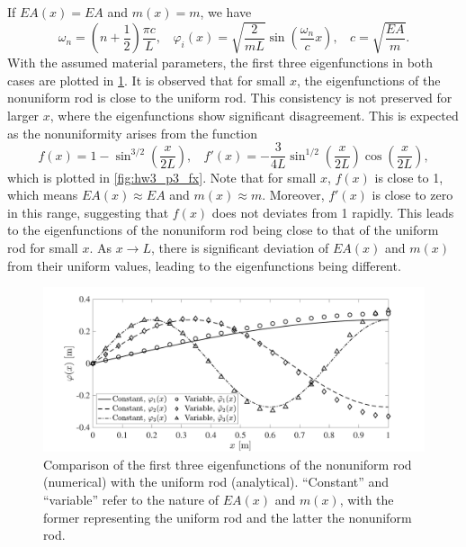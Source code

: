 If $EA(x) = EA$ and $m(x) = m$, we have 
\begin{equation}
    \omega_n = \left(n + \frac{1}{2}\right)\frac{\pi c}{L}, ~~~~ \varphi_i(x) = \sqrt{\frac{2}{m L}} \sin \left(\frac{\omega_n}{c} x\right), ~~~~ c = \sqrt{\frac{EA}{m}}.
\end{equation}
With the assumed material parameters, the first three eigenfunctions in both cases are plotted in \cref{fig:hw3_p3_results}.
It is observed that for small $x$, the eigenfunctions of the nonuniform rod is close to the uniform rod.
This consistency is not preserved for larger $x$, where the eigenfunctions show significant disagreement.
This is expected as the nonuniformity arises from the function
\begin{equation}\label{eqn:hw3_p3_fx}
    f(x) = 1 - \sin^{3/2}\left(\frac{x}{2L}\right), ~~~~ f'(x) = -\frac{3}{4L} \sin^{1/2}\left(\frac{x}{2L}\right) \cos\left(\frac{x}{2L}\right),
\end{equation}
which is plotted in \cref{fig:hw3_p3_fx}.
Note that for small $x$, $f(x)$ is close to 1, which means $EA(x) \approx EA$ and $m(x) \approx m$. 
Moreover, $f'(x)$ is close to zero in this range, suggesting that $f(x)$ does not deviates from 1 rapidly. 
This leads to the eigenfunctions of the nonuniform rod being close to that of the uniform rod for small $x$. 
As $x \rightarrow L$, there is significant deviation of $EA(x)$ and $m(x)$ from their uniform values, leading to the eigenfunctions being different. 
\begin{figure}[!ht]
    \centering
    \includegraphics[width=\textwidth]{homework/hw3/assets/hw3_p3_result.pdf}
    \caption{Comparison of the first three eigenfunctions of the nonuniform rod (numerical) with the uniform rod (analytical). 
    ``Constant'' and ``variable'' refer to the nature of $EA(x)$ and $m(x)$, with the former representing the uniform rod and the latter the nonuniform rod.}
    \label{fig:hw3_p3_results}
\end{figure}

